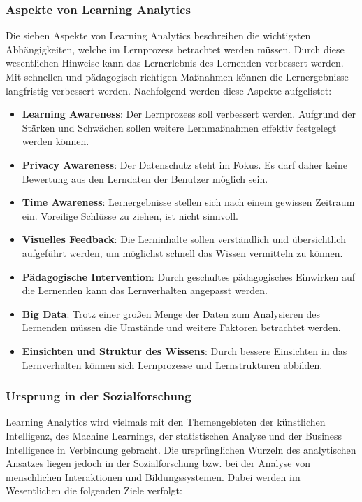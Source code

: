 \subsubsection{Aspekte von Learning Analytics}
Die sieben Aspekte von Learning Analytics\autocite[Vgl.][S. 46 ff.]{EJ-LearningAnalytics} beschreiben die wichtigsten Abhängigkeiten, welche im Lernprozess betrachtet werden müssen.
Durch diese wesentlichen Hinweise kann das Lernerlebnis des Lernenden verbessert werden.
Mit schnellen und pädagogisch richtigen Maßnahmen können die Lernergebnisse langfristig verbessert werden.
Nachfolgend werden diese Aspekte aufgelistet:
%
\begin{itemize}
    \item \textbf{Learning Awareness}: Der Lernprozess soll verbessert werden. Aufgrund der Stärken und Schwächen sollen weitere Lernmaßnahmen effektiv festgelegt werden können.
    \item \textbf{Privacy Awareness}: Der Datenschutz steht im Fokus. Es darf daher keine Bewertung aus den Lerndaten der Benutzer möglich sein.
    \item \textbf{Time Awareness}: Lernergebnisse stellen sich nach einem gewissen Zeitraum ein. Voreilige Schlüsse zu ziehen, ist nicht sinnvoll.
    \item \textbf{Visuelles Feedback}: Die Lerninhalte sollen verständlich und übersichtlich aufgeführt werden, um möglichst schnell das Wissen vermitteln zu können.
    \item \textbf{Pädagogische Intervention}: Durch geschultes pädagogisches Einwirken auf die Lernenden kann das Lernverhalten angepasst werden.
    \item \textbf{Big Data}: Trotz einer großen Menge der Daten zum Analysieren des Lernenden müssen die Umstände und weitere Faktoren betrachtet werden.
    \item \textbf{Einsichten und Struktur des Wissens}: Durch bessere Einsichten in das Lernverhalten können sich Lernprozesse und Lernstrukturen abbilden.
\end{itemize}
%
\subsubsection{Ursprung in der Sozialforschung}

Learning Analytics wird vielmals mit den Themengebieten der künstlichen Intelligenz, des Machine Learnings, der statistischen Analyse und der Business Intelligence in Verbindung gebracht.
Die ursprünglichen Wurzeln des analytischen Ansatzes liegen jedoch in der Sozialforschung bzw. bei der Analyse von menschlichen Interaktionen und Bildungssystemen.\autocite[Vgl.][S. 1383]{ej-GeorgeSiemens}
Dabei werden im Wesentlichen die folgenden Ziele verfolgt:\autocite[Vgl.][ab Minute 11]{ej-GeorgSiemensVideo}

